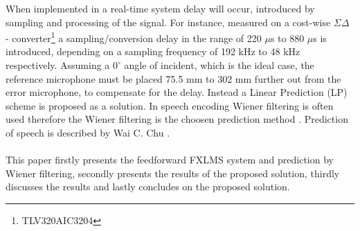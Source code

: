 When implemented in a real-time system delay will occur, introduced by sampling and processing of the signal. For instance, measured on a cost-wise $\Sigma\Delta$ - converter\footnote{TLV320AIC3204} a sampling/conversion delay in the range of 220 $\mu$s to 880 $\mu$s is introduced, depending on a sampling frequency of 192 kHz to 48 kHz respectively. Assuming a $\text{0}^{\circ}$ angle of incident, which is the ideal case, the reference microphone must be placed 75.5 mm to 302 mm further out from the error microphone, to compensate for the delay. Instead a Linear Prediction (LP) scheme is proposed as a solution. In speech encoding Wiener filtering is often used therefore the Wiener filtering is the choosen prediction method \cite{Speech}.
Prediction of speech is described by Wai C. Chu \cite{Speech}. 
\\\\
This paper firstly presents the feedforward FXLMS system and prediction by Wiener filtering, secondly presents the results of the proposed solution, thirdly discusses the results and lastly concludes on the proposed solution.
        







